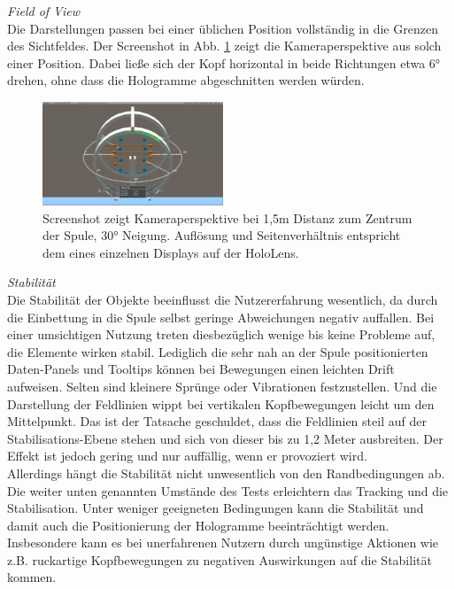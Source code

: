 \textit{Field of View}\\
Die Darstellungen passen bei einer üblichen Position vollständig in die Grenzen des Sichtfeldes. Der Screenshot in Abb. \ref{img:fov} zeigt die Kameraperspektive aus solch einer Position. Dabei ließe sich der Kopf horizontal in beide Richtungen etwa 6° drehen, ohne dass die Hologramme abgeschnitten werden würden.
\begin{figure}
	\centering
	\includegraphics[width=0.48\textwidth]{images/unity/fov.jpg}
	\caption{Screenshot zeigt Kameraperspektive bei 1,5m Distanz zum Zentrum der Spule, 30° Neigung. Auflösung und Seitenverhältnis entspricht dem eines einzelnen Displays auf der HoloLens.}
	\label{img:fov}
\end{figure}

\textit{Stabilität}\\
Die Stabilität der Objekte beeinflusst die Nutzererfahrung wesentlich, da durch die Einbettung in die Spule selbst geringe Abweichungen negativ auffallen. Bei einer umsichtigen Nutzung treten diesbezüglich wenige bis keine Probleme auf, die Elemente wirken stabil. Lediglich die sehr nah an der Spule positionierten Daten-Panels und Tooltips können bei Bewegungen einen leichten Drift aufweisen. Selten sind kleinere Sprünge oder Vibrationen festzustellen. Und die Darstellung der Feldlinien wippt bei vertikalen Kopfbewegungen leicht um den Mittelpunkt. Das ist der Tatsache geschuldet, dass die Feldlinien steil auf der Stabilisations-Ebene stehen und sich von dieser bis zu 1,2 Meter ausbreiten. Der Effekt ist jedoch gering und nur auffällig, wenn er provoziert wird.\\

Allerdings hängt die Stabilität nicht unwesentlich von den Randbedingungen ab. Die weiter unten genannten Umstände des Tests erleichtern das Tracking und die Stabilisation. Unter weniger geeigneten Bedingungen kann die Stabilität und damit auch die Positionierung der Hologramme beeinträchtigt werden. Insbesondere kann es bei unerfahrenen Nutzern durch ungünstige Aktionen wie z.B. ruckartige Kopfbewegungen zu negativen Auswirkungen auf die Stabilität kommen.\\

